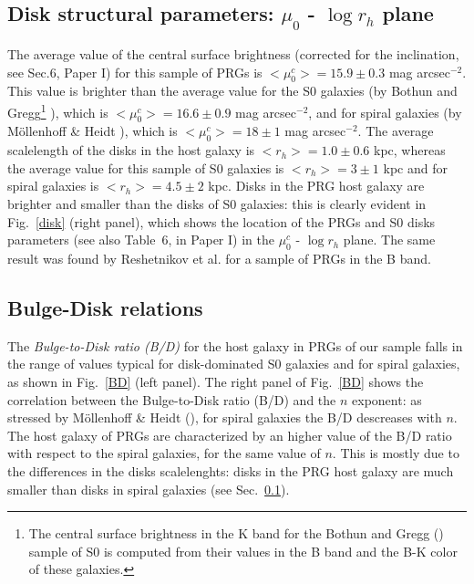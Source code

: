 \documentclass{aa}
\begin{document}
\subsection{Disk structural parameters: $\mu_{0}$ - $\log r_{h}$ 
plane}\label{param_hg3}
The average value of the central surface brightness (corrected
for the inclination, see Sec.6, Paper I) for this sample of PRGs is 
$<\mu_{0}^{c}>=15.9 \pm 0.3$ mag arcsec$^{-2}$. This value is 
brighter than the average value for the S0 galaxies 
(by Bothun and Gregg\footnote{The central surface brightness in the 
K band for the Bothun and Gregg (\cite{Bothun90}) sample of S0 is computed 
from their values in the B band and the B-K color of these galaxies.}
 \cite{Bothun90}), which is $<\mu_{0}^{c}>=16.6 \pm 0.9$ mag arcsec$^{-2}$, and
for spiral galaxies (by M\"{o}llenhoff \& Heidt \cite{mollenhoff2001}), 
which is $<\mu_{0}^{c}>=18 \pm 1$ mag arcsec$^{-2}$.
The average scalelength of the disks in the host galaxy is  
$<r_{h}>=1.0\pm 0.6$ kpc, whereas the average value for this sample of S0 
galaxies is $<r_{h}>=3 \pm 1$ kpc and for spiral galaxies is 
$<r_{h}>=4.5 \pm 2$ kpc.
Disks in the PRG host galaxy are brighter and smaller than the
disks of S0 galaxies: this is clearly evident in
Fig.~\ref{disk} (right panel), which shows the location of the PRGs and 
S0 disks parameters (see also Table~6, in Paper I) in the 
$\mu_{0}^{c}$ - $\log r_{h}$ plane. 
The same result was found by Reshetnikov et al. \cite{Resh94} for
a sample of PRGs in the B band.

\subsection{Bulge-Disk relations}
The {\it Bulge-to-Disk ratio (B/D)} for the host galaxy in PRGs of our sample 
falls in the range of values typical for disk-dominated S0 galaxies and for 
spiral galaxies, as shown in Fig.~\ref{BD} (left panel). 
The right panel of Fig.~\ref{BD} shows the correlation between the 
Bulge-to-Disk ratio (B/D) and the $n$ exponent: as stressed by 
M\"{o}llenhoff \& Heidt (\cite{mollenhoff2001}), for spiral galaxies the
B/D descreases with $n$. The host galaxy of PRGs are characterized by an higher
value of the B/D ratio with respect to the spiral galaxies, for the same value
of $n$. This is mostly due to the differences in the disks scalelenghts: 
disks in the PRG host galaxy are much smaller than disks in spiral galaxies 
(see Sec.~\ref{param_hg3}).
\end{document}
